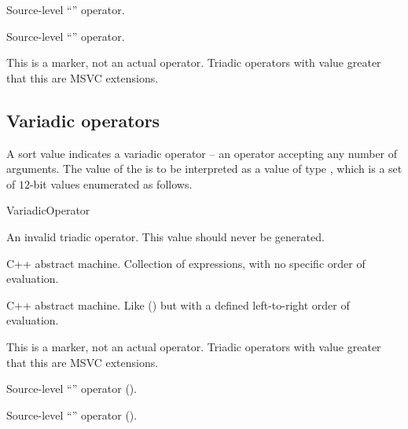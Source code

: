 Source-level ``'' operator.

Source-level ``'' operator.

This is a marker, not an actual operator. Triadic operators with 
value greater that this are MSVC extensions.

\subsection{Variadic operators}
\label{sec:ifc:OperatorSort:Variadic}

A sort value  indicates a variadic operator -- 
an operator accepting any number of arguments.  The
value of the  is to be interpreted as a value of type 
, which is a set of $12$-bit values enumerated as follows.
%
\begin{Enumeration}{VariadicOperator}

	\setcounter{enumi}{1023}
\end{Enumeration}


An invalid triadic operator.  This value should never be generated.


C++ abstract machine.  Collection of expressions, with no specific order of evaluation. 


C++ abstract machine.  Like  
() but with a defined left-to-right 
order of evaluation.

This is a marker, not an actual operator. Triadic operators with 
value greater that this are MSVC extensions.

Source-level ``'' operator ().

Source-level ``'' operator ().

